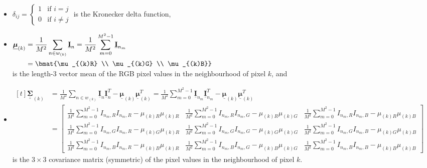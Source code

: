 \documentclass{article}
\def\vt#1{\underline{\mathbf{#1}}}
\def\vts#1{\underline{\boldsymbol{#1}}}
\def\mts#1{\underline{\underline{\boldsymbol{#1}}}}
\begin{document}
\begin{itemize}
    \item $\delta_{ij} = \begin{cases}
        1&\text{if $i=j$}\\
        0&\text{if $i\neq j$}
    \end{cases}$ is the Kronecker delta function,
    \item $\begin{aligned}[t]
        \vts \mu_{(k)} &= \frac1{M^2} \sum_{n\in w_{(k)}} \vt I_{n} = \frac1{M^2} \sum_{m=0}^{M^2-1} \vt I_{n_m} \\
        &= \bmat{\mu_{(k)R} \\ \mu_{(k)G} \\ \mu_{(k)B}}
    \end{aligned}$ \\
    is the length-$3$ vector mean of the RGB pixel values in the neighbourhood of pixel $k$, and
    \item $\begin{aligned}[t]
        \mts \Sigma_{(k)}
        &= \frac1{M^2} \sum_{n\in w_{(k)}} \vt I_{n} \vt I_{n}^T  - \vts \mu_{(k)} \vts \mu_{(k)}^T = \frac1{M^2} \sum_{m=0}^{M^2-1} \vt I_{n_m} \vt I_{n_m}^T  - \vts \mu_{(k)} \vts \mu_{(k)}^T \\
        &= \left[\begin{smallmatrix}
            \frac1{M^2} \sum_{m=0}^{M^2-1} I_{n_m,R}I_{n_m,R} - \mu_{(k)R}\mu_{(k)R} & \frac1{M^2} \sum_{m=0}^{M^2-1} I_{n_m,R}I_{n_m,G} - \mu_{(k)R}\mu_{(k)G} & \frac1{M^2} \sum_{m=0}^{M^2-1} I_{n_m,R}I_{n_m,B} - \mu_{(k)R}\mu_{(k)B}\\
            \frac1{M^2} \sum_{m=0}^{M^2-1} I_{n_m,G}I_{n_m,R} - \mu_{(k)G}\mu_{(k)R} & \frac1{M^2} \sum_{m=0}^{M^2-1} I_{n_m,G}I_{n_m,G} - \mu_{(k)G}\mu_{(k)G} & \frac1{M^2} \sum_{m=0}^{M^2-1} I_{n_m,G}I_{n_m,B} - \mu_{(k)G}\mu_{(k)B}\\
            \frac1{M^2} \sum_{m=0}^{M^2-1} I_{n_m,B}I_{n_m,R} - \mu_{(k)B}\mu_{(k)R} & \frac1{M^2} \sum_{m=0}^{M^2-1} I_{n_m,B}I_{n_m,G} - \mu_{(k)B}\mu_{(k)G} & \frac1{M^2} \sum_{m=0}^{M^2-1} I_{n_m,B}I_{n_m,B} - \mu_{(k)B}\mu_{(k)B}
       \end{smallmatrix}\right]
    \end{aligned}$\\
    is the $3\times 3$ covariance matrix (symmetric) of the pixel values in the neighbourhood of pixel $k$.
\end{itemize}
\end{document}

